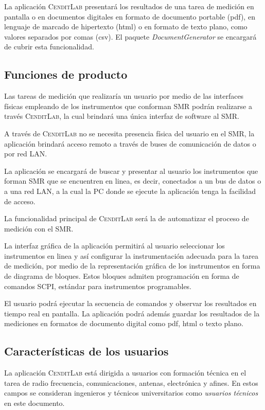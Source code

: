 \documentclass[paper=a4,oneside,fontsize=12pt]{article}
\newcommand{\AppName}{\textsc{CenditLab}\xspace}
\newcommand{\SMR}{SMR\xspace}
\begin{document}
	La aplicación \AppName presentará los resultados de una tarea de medición en pantalla o en documentos digitales en formato de documento portable (pdf), en lenguaje de marcado de hipertexto (html) o en formato de texto plano, como valores separados por comas (csv). El paquete \emph{DocumentGenerator} se encargará de cubrir esta funcionalidad.
	
	\subsection{Funciones de producto}
	
	Las tareas de medición que realizaría un usuario por medio de las interfaces físicas empleando de los instrumentos que conforman \SMR 
	podrán realizarse a través \AppName, la cual brindará una única interfaz de software al \SMR. 
	
	A través de \AppName no se necesita presencia física del usuario en el \SMR, la aplicación brindará acceso remoto a través de buses de comunicación de datos o por red LAN. 
	
	La aplicación se encargará de buscar y presentar al usuario los instrumentos que forman \SMR que se encuentren en linea, es decir, conectados a un bus de datos o a una red LAN, a la cual la PC donde se ejecute la aplicación tenga la facilidad de acceso.
	
	La funcionalidad principal de \AppName será la de automatizar el proceso de medición con el  \SMR. 
	
	La interfaz gráfica de la aplicación permitirá al usuario seleccionar los instrumentos en linea y así configurar la instrumentación adecuada para la tarea de medición, por medio de la representación gráfica de los instrumentos en forma de diagrama de bloques. Estos bloques admiten programación en forma de comandos SCPI,  estándar para instrumentos programables.
	
	El usuario podrá ejecutar la secuencia de comandos y observar los resultados en tiempo real en pantalla. La aplicación podrá además guardar los resultados de la mediciones en formatos de documento digital como pdf, html o texto plano.		
	
	\subsection{Características de los usuarios}
	
	La aplicación \AppName está dirigida a usuarios con formación técnica en el tarea de radio frecuencia, comunicaciones, antenas, electrónica y afines. En estos campos se  consideran ingenieros y técnicos universitarios como \emph{usuarios técnicos} en este documento.
	
\end{document}
